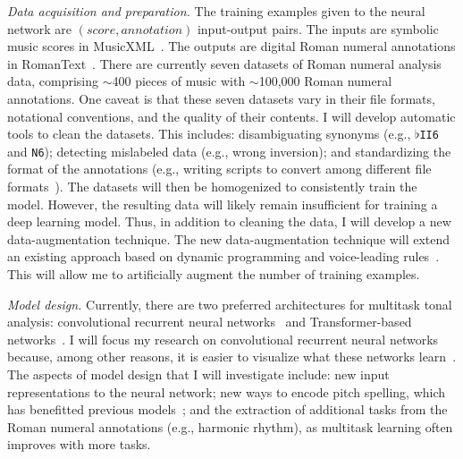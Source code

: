 \documentclass[12pt]{article}
\begin{document}
\emph{Data acquisition and preparation.}
The training examples given to the neural network are $(score, annotation)$ input-output pairs.
The inputs are symbolic music scores in MusicXML~\cite{good2001musicxml}.
The outputs are digital Roman numeral annotations in RomanText~\cite{gotham_romantext_2019}.
There are currently seven datasets of Roman numeral analysis data, comprising $\sim$400 pieces of music with $\sim$100,000 Roman numeral annotations.
One caveat is that these seven datasets vary in their file formats, notational conventions, and the quality of their contents.
I will develop automatic tools to clean the datasets.
This includes:
disambiguating synonyms (e.g., $\flat$\texttt{II6} and \texttt{N6});
detecting mislabeled data (e.g., wrong inversion);
and standardizing the format of the annotations (e.g., writing scripts to convert among different file formats~\cite{gotham_romantext_2019, napoles_lopez_harmalysis_2020}).
The datasets will then be homogenized to consistently train the model.
However, the resulting data will likely remain insufficient for training a deep learning model.
Thus, in addition to cleaning the data, I will develop a new data-augmentation technique.
The new data-augmentation technique will extend an existing approach based on dynamic programming and voice-leading rules~\cite{napoles_lopez_harmonic_2020}.
This will allow me to artificially augment the number of training examples.

\emph{Model design.}
Currently, there are two preferred architectures for multitask tonal analysis:
convolutional recurrent neural networks~\cite{micchi_not_2020} and Transformer-based networks~\cite{chen_attend_2021}.
I will focus my research on convolutional recurrent neural networks because, among other reasons, it is easier to visualize what these networks learn~\cite{lin2016visualizing}.
The aspects of model design that I will investigate include:
new input representations to the neural network;
new ways to encode pitch spelling, which has benefitted previous models~\cite{micchi_not_2020};
and the extraction of additional tasks from the Roman numeral annotations (e.g., harmonic rhythm), as multitask learning often improves with more tasks.
\end{document}
